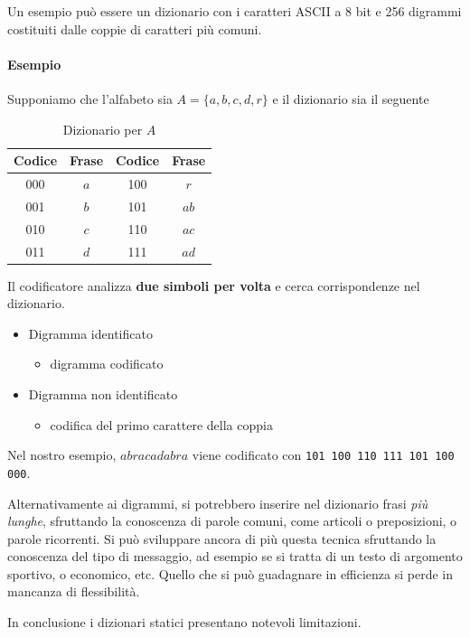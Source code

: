 Un esempio può essere un dizionario con i caratteri ASCII a 8 bit e 256 digrammi costituiti dalle coppie di caratteri più comuni.
\paragraph{Esempio}
Supponiamo che l'alfabeto sia $A=\{a,b,c,d,r\}$ e il dizionario sia il seguente
\begin{table}[ht]
\centering
\begin{tabular}{|c c|c c|}
\hline
\textbf{Codice} & \textbf{Frase} & \textbf{Codice} & \textbf{Frase} \\
\hline
000 & $a$ & 100 & $r$ \\
001 & $b$ & 101 & $ab$ \\
010 & $c$ & 110 & $ac$ \\
011 & $d$ & 111 & $ad$ \\
\hline
\end{tabular}
\caption{Dizionario per $A$}
\end{table}
Il codificatore analizza \textbf{due simboli per volta} e cerca corrispondenze nel dizionario.
\begin{itemize}
    \item Digramma identificato
        \begin{itemize}
            \item[$\Rightarrow$] digramma codificato
        \end{itemize}
    \item Digramma non identificato
        \begin{itemize}
            \item[$\Rightarrow$] codifica del primo carattere della coppia
        \end{itemize}
\end{itemize}
Nel nostro esempio, $abracadabra$ viene codificato con \texttt{101\,100\,110\,111\,101\,100\,000}.

Alternativamente ai digrammi, si potrebbero inserire nel dizionario frasi \textit{più lunghe}, sfruttando la conoscenza di parole comuni, come articoli o preposizioni, o parole ricorrenti. Si può sviluppare ancora di più questa tecnica sfruttando la conoscenza del tipo di messaggio, ad esempio se si tratta di un testo di argomento sportivo, o economico, etc. Quello che si può guadagnare in efficienza si perde in mancanza di flessibilità.

In conclusione i dizionari statici presentano notevoli limitazioni.

